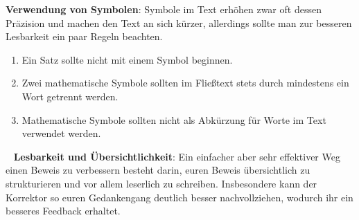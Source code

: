 \textbf{Verwendung von Symbolen}:\newline
Symbole im Text erhöhen zwar oft dessen Präzision und machen den Text an sich kürzer, allerdings sollte man zur besseren Lesbarkeit ein paar Regeln beachten.
\begin{enumerate}
    \item 
    Ein Satz sollte nicht mit einem Symbol beginnen. 
    \item
    Zwei mathematische Symbole sollten im Fließtext stets durch mindestens ein Wort getrennt werden. 
    \item 
    Mathematische Symbole sollten nicht als Abkürzung für Worte im Text verwendet werden. 
\end{enumerate}\
\newline
\textbf{Lesbarkeit und Übersichtlichkeit}: \newline 
Ein einfacher aber sehr effektiver Weg einen Beweis zu verbessern besteht darin, euren Beweis übersichtlich zu strukturieren und vor allem leserlich zu schreiben. 
Insbesondere kann der Korrektor so euren Gedankengang deutlich besser nachvollziehen, wodurch ihr ein besseres Feedback erhaltet.






